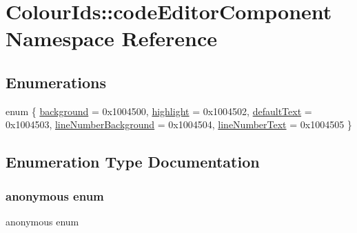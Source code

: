 \hypertarget{namespaceColourIds_1_1codeEditorComponent}{}\section{Colour\+Ids\+:\+:code\+Editor\+Component Namespace Reference}
\label{namespaceColourIds_1_1codeEditorComponent}
\subsection*{Enumerations}
\begin{DoxyCompactItemize}
\item 
enum \{ \newline
\mbox{\hyperlink{namespaceColourIds_1_1codeEditorComponent_aa3d3091eb86dd39319976f26287b19baad37c697e93c5ea2d02734673850f50e1}{background}} = 0x1004500, 
\mbox{\hyperlink{namespaceColourIds_1_1codeEditorComponent_aa3d3091eb86dd39319976f26287b19baae2dd91d22e6bd531ad94597d44c577b4}{highlight}} = 0x1004502, 
\mbox{\hyperlink{namespaceColourIds_1_1codeEditorComponent_aa3d3091eb86dd39319976f26287b19baae5466f247f62a9acfd92a52ce5990b0a}{default\+Text}} = 0x1004503, 
\mbox{\hyperlink{namespaceColourIds_1_1codeEditorComponent_aa3d3091eb86dd39319976f26287b19baa01e80ed279a7b33b95cb86702b3de9c4}{line\+Number\+Background}} = 0x1004504, 
\newline
\mbox{\hyperlink{namespaceColourIds_1_1codeEditorComponent_aa3d3091eb86dd39319976f26287b19baa4219465e0602756a902ee5f7b6fb7e1c}{line\+Number\+Text}} = 0x1004505
 \}
\end{DoxyCompactItemize}


\subsection{Enumeration Type Documentation}
\mbox{\label{namespaceColourIds_1_1codeEditorComponent_aa3d3091eb86dd39319976f26287b19ba}} 
\subsubsection{\texorpdfstring{anonymous enum}{anonymous enum}}
{\footnotesize\ttfamily anonymous enum}

